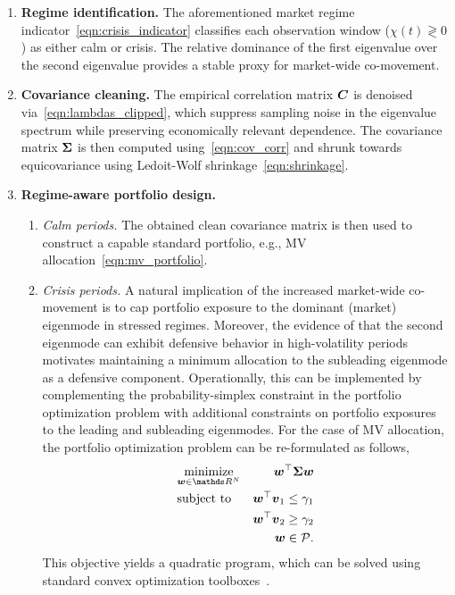 \documentclass[pdflatex,sn-basic]{sn-jnl}%
\theoremstyle{thmstyleone}%
\theoremstyle{thmstyletwo}%
\theoremstyle{thmstylethree}%
\begin{document}
\begin{enumerate}
    \item \textbf{Regime identification.} The aforementioned market regime 
    indicator~\eqref{eqn:crisis_indicator} classifies each observation window 
    ($\chi(t)\gtrless0$) as either calm or crisis. The relative dominance 
    of the first eigenvalue over the second eigenvalue provides a stable proxy for 
    market-wide co-movement.

    \item \textbf{Covariance cleaning.} The empirical correlation matrix $\boldsymbol{C}$ is denoised 
    via~\eqref{eqn:lambdas_clipped},  which suppress sampling noise in the eigenvalue spectrum 
    while preserving economically relevant dependence. The covariance matrix $\boldsymbol{\Sigma}$
    is then computed using~\eqref{eqn:cov_corr} and shrunk towards equicovariance using Ledoit-Wolf 
    shrinkage~\eqref{eqn:shrinkage}.

    \item \textbf{Regime-aware portfolio design.}
    \begin{enumerate}
        \item \emph{Calm periods.} The obtained clean covariance matrix is then
        used to construct a capable standard portfolio, e.g., MV allocation~\eqref{eqn:mv_portfolio}.
        \item \emph{Crisis periods.} A natural implication of the increased market-wide co-movement 
        is to cap portfolio exposure to the dominant (market) eigenmode 
        in stressed regimes. Moreover, the evidence of \citet{molero2025random} that the second 
        eigenmode can exhibit defensive behavior in high-volatility periods motivates 
        maintaining a minimum allocation to the subleading eigenmode as a defensive component. 
        Operationally, this can be implemented by complementing the probability-simplex constraint 
        in the portfolio optimization problem with additional constraints on portfolio exposures to 
        the leading and subleading eigenmodes. For the case of MV allocation, the portfolio 
        optimization problem can be re-formulated as follows,
        \begin{equation}
        \label{eqn:regime_aware_problem}
            \begin{aligned}
                & \underset{\bw\in\real{N}}{\textrm{minimize}} & \bw^{\top} \bSigma \bw\\
                & \textrm{subject to} & \bw^{\top} \bv_1 \leq \gamma_1 \\
                & & \bw^{\top} \bv_2 \geq \gamma_2 \\
                & & \bw \in \calP.
            \end{aligned}
        \end{equation}
        This objective yields a quadratic program, which can be solved using standard convex 
        optimization toolboxes~\citep[see, e.g.,][]{grant2009cvx, mathworks2025quadprog}.
    \end{enumerate}
\end{enumerate}
\end{document}
